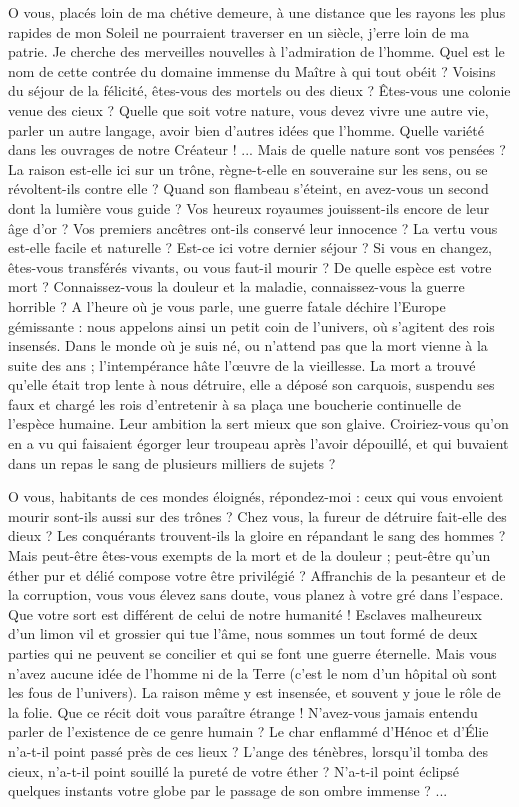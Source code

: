 \documentclass[a4paper, 11pt, oneside]{article}
\begin{document}
O vous, placés loin de ma chétive demeure, à une distance que les rayons les plus rapides de mon Soleil ne pourraient traverser en un siècle, j'erre loin de ma patrie. Je cherche des merveilles nouvelles à l'admiration de l'homme. Quel est le nom de cette contrée du domaine immense du Maître à qui tout obéit ? Voisins du séjour de la félicité, êtes-vous des mortels ou des dieux ? Êtes-vous une colonie venue des cieux ? Quelle que soit votre nature, vous devez vivre une autre vie, parler un autre langage, avoir bien d'autres idées que l'homme. Quelle variété dans les ouvrages de notre Créateur ! ... Mais de quelle nature sont vos pensées ? La raison est-elle ici sur un trône, règne-t-elle en souveraine sur les sens, ou se révoltent-ils contre elle ? Quand son flambeau s'éteint, en avez-vous un second dont la lumière vous guide ? Vos heureux royaumes jouissent-ils encore de leur âge d'or ? Vos premiers ancêtres ont-ils conservé leur innocence ? La vertu vous est-elle facile et naturelle ? Est-ce ici votre dernier séjour ? Si vous en changez, êtes-vous transférés vivants, ou vous faut-il mourir ? De quelle espèce est votre mort ? Connaissez-vous la douleur et la maladie, connaissez-vous la guerre horrible ? A l'heure où je vous parle, une guerre fatale déchire l'Europe gémissante : nous appelons ainsi un petit coin de l'univers, où s'agitent des rois insensés. Dans le monde où je suis né, ou n'attend pas que la mort vienne à la suite des ans ; l'intempérance hâte l'œuvre de la vieillesse. La mort a trouvé qu'elle était trop lente à nous détruire, elle a déposé son carquois, suspendu ses faux et chargé les rois d'entretenir à sa plaça une boucherie continuelle de l'espèce humaine. Leur ambition la sert mieux que son glaive. Croiriez-vous qu'on en a vu qui faisaient égorger leur troupeau après l'avoir dépouillé, et qui buvaient dans un repas le sang de plusieurs milliers de sujets ?

O vous, habitants de ces mondes éloignés, répondez-moi : ceux qui vous envoient mourir sont-ils aussi sur des trônes ? Chez vous, la fureur de détruire fait-elle des dieux ? Les conquérants trouvent-ils la gloire en répandant le sang des hommes ? Mais peut-être êtes-vous exempts de la mort et de la douleur ; peut-être qu'un éther pur et délié compose votre être privilégié ? Affranchis de la pesanteur et de la corruption, vous vous élevez sans doute, vous planez à votre gré dans l'espace. Que votre sort est différent de celui de notre humanité ! Esclaves malheureux d'un limon vil et grossier qui tue l'âme, nous sommes un tout formé de deux parties qui ne peuvent se concilier et qui se font une guerre éternelle. Mais vous n'avez aucune idée de l'homme ni de la Terre (c'est le nom d'un hôpital où sont les fous de l'univers). La raison même y est insensée, et souvent y joue le rôle de la folie. Que ce récit doit vous paraître étrange ! N'avez-vous jamais entendu parler de l'existence de ce genre humain ? Le char enflammé d'Hénoc et d'Élie n'a-t-il point passé près de ces lieux ? L'ange des ténèbres, lorsqu'il tomba des cieux, n'a-t-il point souillé la pureté de votre éther ? N'a-t-il point éclipsé quelques instants votre globe par le passage de son ombre immense ? ...
\end{document}
